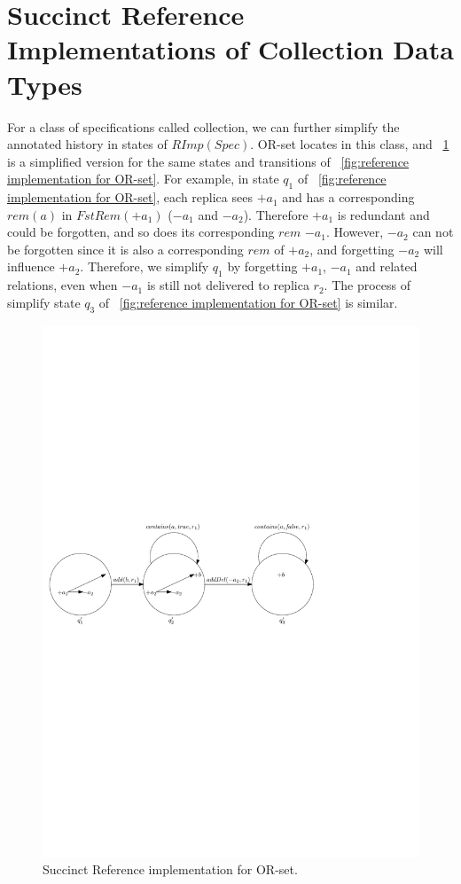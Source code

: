 
\section{Succinct Reference Implementations of Collection Data Types}
\label{sec:succinct reference implementations of collection data types}


{\color {red}For a class of specifications called collection, we can further simplify the annotated history in states of $\mathit{RImp}(\mathit{Spec})$. OR-set locates in this class, and \figurename~\ref{fig:succinct reference implementation for OR-set} is a simplified version for the same states and transitions of \figurename~\ref{fig:reference implementation for OR-set}. For example, in state $q_1$ of \figurename~\ref{fig:reference implementation for OR-set}, each replica sees $+a_1$ and has a corresponding $\mathit{rem}(a)$ in $\mathit{FstRem}(+a_1)$ ($-a_1$ and $-a_2$). Therefore $+a_1$ is redundant and could be forgotten, and so does its corresponding $\mathit{rem}$ $-a_1$. However, $-a_2$ can not be forgotten since it is also a corresponding $\mathit{rem}$ of $+a_2$, and forgetting $-a_2$ will influence $+a_2$. Therefore, we simplify $q_1$ by forgetting $+a_1$, $-a_1$ and related relations, even when $-a_1$ is still not delivered to replica $r_2$. The process of simplify state $q_3$ of \figurename~\ref{fig:reference implementation for OR-set} is similar. }

\begin{figure}[t]
  \centering
  \includegraphics[width=0.7 \textwidth]{figures/PIC-SRImp.pdf}
  \caption{Succinct Reference implementation for OR-set.}
  \label{fig:succinct reference implementation for OR-set}
\end{figure}



